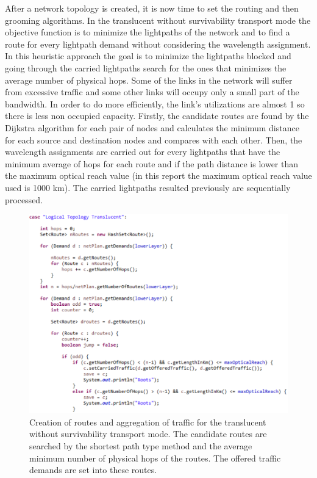 \vspace{11pt}
After a network topology is created, it is now time to set the routing and then grooming algorithms. In the translucent without survivability transport mode the objective function is to minimize the lightpaths of the network and to find a route for every lightpath demand without considering the wavelength assignment. In this heuristic approach the goal is to minimize the lightpaths blocked and going through the carried lightpaths search for the ones that minimizes the average number of physical hops. Some of the links in the network will suffer from excessive traffic and some other links will occupy only a small part of the bandwidth. In order to do more efficiently, the link's utilizations are almost 1 so there is less non occupied capacity. Firstly, the candidate routes are found by the Dijkstra algorithm for each pair of nodes and calculates the minimum distance for each source and destination nodes and compares with each other. Then, the wavelength assignments are carried out for every lightpaths that have the minimum average of hops for each route and if the path distance is lower than the maximum optical reach value (in this report the maximum optical reach value used is 1000 km). The carried lightpaths resulted previously are sequentially processed.

\begin{figure}[H]
\centering
\includegraphics[width=14cm]{sdf/heuristic/translucent_survivability/figures/grooming_translucent_surv1}
\caption{Creation of routes and aggregation of traffic for the translucent without survivability transport mode. The candidate routes are searched by the shortest path type method and the average minimum number of physical hops of the routes. The offered traffic demands are set into these routes.}
\label{grooming_translucent_surv1}
\end{figure}

